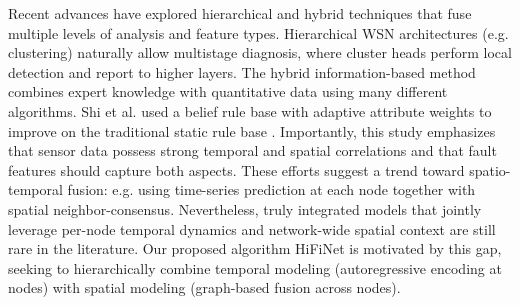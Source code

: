 Recent advances have explored hierarchical and hybrid techniques that fuse multiple levels of analysis and feature types. Hierarchical WSN architectures (e.g. clustering) naturally allow multistage diagnosis, where cluster heads perform local detection and report to higher layers. The hybrid information-based method combines expert knowledge with quantitative data using many different algorithms. Shi et al. used a belief rule base with adaptive attribute weights to improve on the traditional static rule base \cite{Shi2024}. Importantly, this study emphasizes that sensor data possess strong temporal and spatial correlations and that fault features should capture both aspects. These efforts suggest a trend toward spatio-temporal fusion: e.g. using time-series prediction at each node together with spatial neighbor-consensus. Nevertheless, truly integrated models that jointly leverage per-node temporal dynamics and network-wide spatial context are still rare in the literature. Our proposed algorithm HiFiNet is motivated by this gap, seeking to hierarchically combine temporal modeling (autoregressive encoding at nodes) with spatial modeling (graph-based fusion across nodes).

